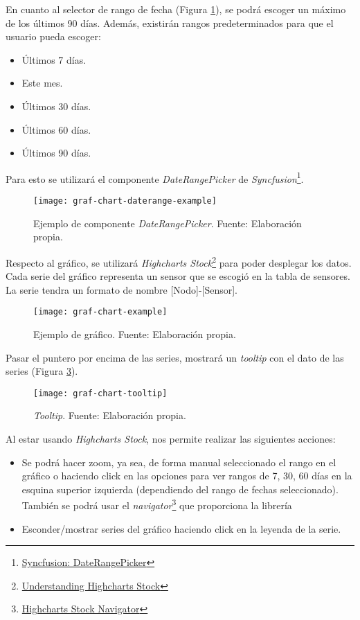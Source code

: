 En cuanto al selector de rango de fecha (Figura \ref{fig:graf-chart-daterange-example}), se podrá escoger un máximo de los últimos 90 días. Además, existirán rangos predeterminados para que el usuario pueda escoger:
\begin{itemize}
    \item Últimos 7 días.
    \item Este mes.
    \item Últimos 30 días.
    \item Últimos 60 días.
    \item Últimos 90 días.
\end{itemize}
Para esto se utilizará el componente \textit{DateRangePicker} de \textit{Syncfusion}\footnote{\href{https://ej2.syncfusion.com/react/documentation/daterangepicker/getting-started}{Syncfusion: DateRangePicker}}.
\begin{figure}[H]
	\centering
	\texttt{[image: graf-chart-daterange-example]}
	\caption{\label{fig:graf-chart-daterange-example} Ejemplo de componente \textit{DateRangePicker}. Fuente: Elaboración propia.}
\end{figure}
Respecto al gráfico, se utilizará \textit{Highcharts Stock}\footnote{\href{https://www.highcharts.com/docs/stock/understanding-highcharts-stock}{Understanding Highcharts Stock}} para poder desplegar los datos. Cada serie del gráfico representa un sensor que se escogió en la tabla de sensores. La serie tendra un formato de nombre [Nodo]-[Sensor].
\begin{figure}[H]
	\centering
	\texttt{[image: graf-chart-example]}
	\caption{\label{fig:graf-chart-example} Ejemplo de gráfico. Fuente: Elaboración propia.}
\end{figure}

Pasar el puntero por encima de las series, mostrará un \textit{tooltip} con el dato de las series (Figura \ref{fig:graf-chart-tooltip}).
\begin{figure}[H]
	\centering
	\texttt{[image: graf-chart-tooltip]}
	\caption{\label{fig:graf-chart-tooltip} \textit{Tooltip}. Fuente: Elaboración propia.}
\end{figure}
Al estar usando \textit{Highcharts Stock}, nos permite realizar las siguientes acciones:
\begin{itemize}
    \item Se podrá hacer zoom, ya sea, de forma manual seleccionado el rango en el gráfico o haciendo click en las opciones para ver rangos de 7, 30, 60 días en la esquina superior izquierda (dependiendo del rango de fechas seleccionado). También se podrá usar el \textit{navigator}\footnote{\href{https://www.highcharts.com/docs/stock/navigator}{Highcharts Stock Navigator}} que proporciona la librería
    \item Esconder/mostrar series del gráfico haciendo click en la leyenda de la serie.
\end{itemize}

